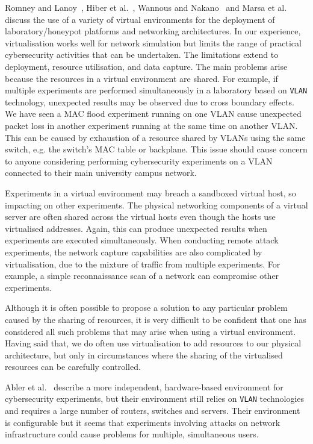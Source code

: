\documentclass{ieeeaccess}
\begin{document}
Romney and Lanoy~\cite{LR:06}, Hiber et al.~\cite{HRS:08}, Wannous and
Nakano~\cite{WN:10} and Marsa et al.~\cite{MGDL:13} discuss the use of a
variety of virtual environments for the deployment of laboratory/honeypot
platforms and networking architectures. In our experience, virtualisation works
well for network simulation but limits the range of practical cybersecurity
activities that can be undertaken. The limitations extend to deployment,
resource utilisation, and data capture. The main problems arise because the
resources in a virtual environment are shared. For example, if multiple
experiments are performed simultaneously in a laboratory based on \texttt{VLAN}
technology, unexpected results may be observed due to cross boundary effects.
We have seen a MAC flood experiment running on one VLAN cause unexpected packet
loss in another experiment running at the same time on another VLAN. This can
be caused by exhaustion of a resource shared by VLANs using the same switch,
e.g. the switch's MAC table or backplane. This issue should cause concern to
anyone considering performing cybersecurity experiments on a VLAN connected to
their main university campus network.

Experiments in a virtual environment may breach a sandboxed virtual host, so
impacting on other experiments. The physical networking components of a virtual
server are often shared across the virtual hosts even though the hosts use
virtualised addresses. Again, this can produce unexpected results when
experiments are executed simultaneously. When conducting remote attack
experiments, the network capture capabilities are also complicated by
virtualisation, due to the mixture of traffic from multiple experiments. For
example, a simple reconnaissance scan of a network can compromise other
experiments.

Although it is often possible to propose a solution to any particular problem
caused by the sharing of resources, it is very difficult to be confident that
one has considered all such problems that may arise when using a virtual
environment. Having said that, we do often use virtualisation to add resources
to our physical architecture, but only in circumstances where the sharing of
the virtualised resources can be carefully controlled.

Abler et al.~\cite{ACG:06} describe a more independent, hardware-based
environment for cybersecurity experiments, but their environment still relies
on \texttt{VLAN} technologies and requires a large number of routers, switches
and servers. Their environment is configurable but it seems that experiments
involving attacks on network infrastructure could cause problems for multiple,
simultaneous users.
\end{document}
